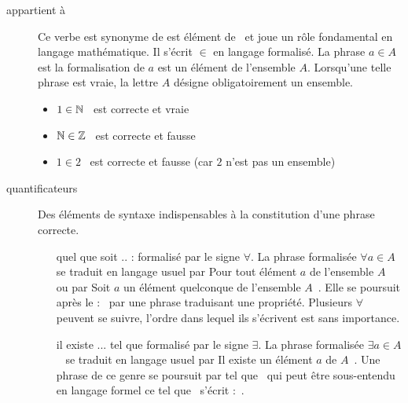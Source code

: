 \begin{description}
\item[appartient à] Ce verbe est synonyme de \og est élément de\fg~ et joue un rôle fondamental en langage mathématique. Il s'écrit $\in$ en langage formalisé. La phrase \og $a \in A $\fg~ est la formalisation de $a$ est un élément de l'ensemble $A$. Lorsqu'une telle phrase est vraie, la lettre $A$ désigne obligatoirement un ensemble.
\begin{itemize}
 \item \og$1 \in \mathbb{N}$\fg~ est correcte et vraie
 \item \og$\mathbb{N} \in \mathbb{Z}$\fg~ est correcte et fausse
 \item \og$ 1\in 2 $\fg~ est correcte et fausse (car $2$ n'est pas un ensemble)
\end{itemize}

\item[quantificateurs] Des éléments de syntaxe indispensables à la constitution d'une phrase correcte.
\begin{itemize}
 \item[quel que soit .. : ] formalisé par le signe $\forall$. La phrase formalisée \og$\forall a \in A$\fg~ se traduit en langage usuel par \og Pour tout élément $a$ de l'ensemble $A$\fg~ ou par \og Soit $a$ un élément quelconque de l'ensemble $A$\fg~. Elle se poursuit après le \og :\fg~ par une phrase traduisant une propriété. Plusieurs $\forall$ peuvent se suivre, l'ordre dans lequel ils s'écrivent est sans importance.
\item [il existe ... tel que ] formalisé par le signe $\exists$. La phrase formalisée \og $\exists a \in A$\fg~ se traduit en langage usuel par \og Il existe un élément $a$ de $A$\fg~. Une phrase de ce genre se poursuit par \og tel que\fg~ qui peut être sous-entendu en langage formel ce \og tel que\fg~ s'écrit \og :\fg~.
\end{itemize}
\end{description}
